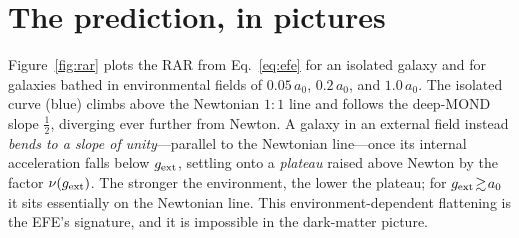 \documentclass[aps,prd,twocolumn,10pt,nofootinbib]{revtex4-2}
\begin{document}
\section{The prediction, in pictures}
Figure~\ref{fig:rar} plots the RAR from Eq.~\eqref{eq:efe} for an isolated galaxy and for galaxies bathed in
environmental fields of $0.05\,a_0$, $0.2\,a_0$, and $1.0\,a_0$. The isolated curve (blue) climbs above the
Newtonian $1\!:\!1$ line and follows the deep-MOND slope $\tfrac12$, diverging ever further from Newton. A galaxy
in an external field instead \emph{bends to a slope of unity}---parallel to the Newtonian line---once its internal
acceleration falls below $g_{\rm ext}$, settling onto a \emph{plateau} raised above Newton by the factor
$\nu(g_{\rm ext})$. The stronger the environment, the lower the plateau; for $g_{\rm ext}\!\gtrsim\!a_0$ it sits
essentially on the Newtonian line. This environment-dependent flattening is the EFE's signature, and it is
impossible in the dark-matter picture.
\end{document}
